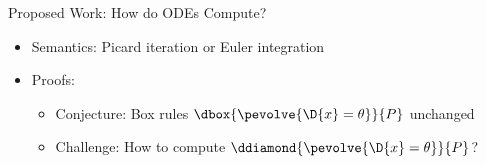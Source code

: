 \documentclass[slidestop,aspectratio=169]{beamer}
\newcommand{\xgvar}{\textsf{x}}
\newcommand{\ygvar}{\textsf{y}}
\newcommand{\kvar}{\textsf{k}}
\newcommand{\tvar}{\textsf{t}}
\newcommand{\Tvar}{{\sf T}\xspace}
\newcommand{\vvar}{{\sf v}\xspace}
\newcommand{\avar}{{\sf a}\xspace}
\newcommand{\ctrl}{\textsf{ctrl}\xspace}
\newcommand{\plant}{\textsf{phys}\xspace}
\theoremstyle{plain}
\theoremstyle{definition}
\theoremstyle{remark}
\newcommand{\ctrlcolor}[1]{{\color{vred}{#1}}}
\newcommand{\plantcolor}[1]{{\color{vblue}{#1}}}
\begin{document}





\begin{frame}[t]{Proposed Work: How do ODEs Compute?}
  \begin{itemize}
  \item Semantics: Picard iteration or Euler integration
  \item Proofs:
\begin{itemize}
  \item Conjecture: Box rules $\dbox{\pevolve{\D{x}=\theta}}{P}$ unchanged
  \item Challenge: How to compute $\ddiamond{\pevolve{\D{x}=\theta}}{P}$?
\end{itemize}
  \end{itemize}
\end{frame}
\end{document}
